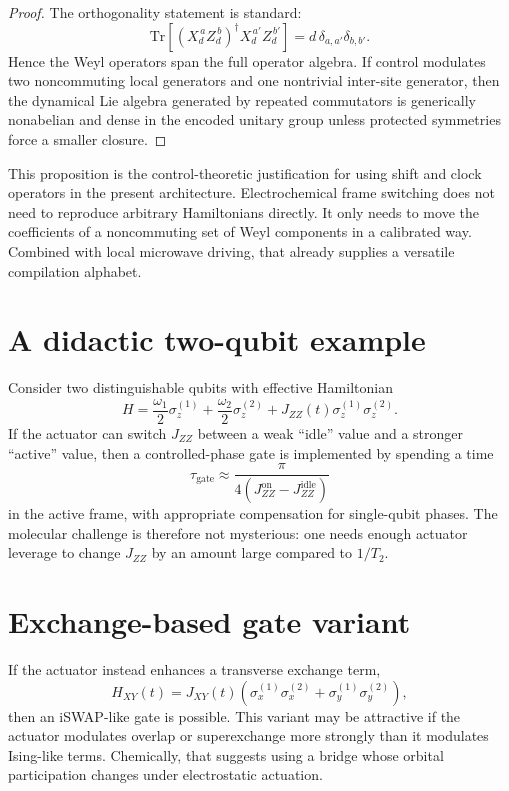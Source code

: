 \documentclass[11pt]{report}
\newcommand{\ham}{Hamiltonian}
\newcommand{\Tr}{\mathrm{Tr}}
\newcommand{\Xd}{X_d}
\newcommand{\Zd}{Z_d}
\theoremstyle{definition}
\begin{document}
\begin{proof}
The orthogonality statement is standard:
\[
\Tr\!\left[(\Xd^{\,a}\Zd^{\,b})^\dagger \Xd^{\,a'}\Zd^{\,b'}\right]
=
d\,\delta_{a,a'}\delta_{b,b'}.
\]
Hence the Weyl operators span the full operator algebra. If control modulates two noncommuting local generators and one nontrivial inter-site generator, then the dynamical Lie algebra generated by repeated commutators is generically nonabelian and dense in the encoded unitary group unless protected symmetries force a smaller closure.
\end{proof}

This proposition is the control-theoretic justification for using shift and clock operators in the present architecture. Electrochemical frame switching does not need to reproduce arbitrary Hamiltonians directly. It only needs to move the coefficients of a noncommuting set of Weyl components in a calibrated way. Combined with local microwave driving, that already supplies a versatile compilation alphabet.

\section{A didactic two-qubit example}
Consider two distinguishable qubits with effective \ham{}
\[
H = \frac{\omega_1}{2}\sigma_z^{(1)} + \frac{\omega_2}{2}\sigma_z^{(2)}
+ J_{ZZ}(t)\sigma_z^{(1)}\sigma_z^{(2)}.
\]
If the actuator can switch $J_{ZZ}$ between a weak ``idle'' value and a stronger ``active'' value, then a controlled-phase gate is implemented by spending a time
\[
\tau_{\mathrm{gate}} \approx \frac{\pi}{4\left(J_{ZZ}^{\mathrm{on}}-J_{ZZ}^{\mathrm{idle}}\right)}
\]
in the active frame, with appropriate compensation for single-qubit phases. The molecular challenge is therefore not mysterious: one needs enough actuator leverage to change $J_{ZZ}$ by an amount large compared to $1/T_2$.

\section{Exchange-based gate variant}
If the actuator instead enhances a transverse exchange term,
\[
H_{XY}(t) = J_{XY}(t)\left(\sigma_x^{(1)}\sigma_x^{(2)}+\sigma_y^{(1)}\sigma_y^{(2)}\right),
\]
then an iSWAP-like gate is possible. This variant may be attractive if the actuator modulates overlap or superexchange more strongly than it modulates Ising-like terms. Chemically, that suggests using a bridge whose orbital participation changes under electrostatic actuation.
\end{document}
